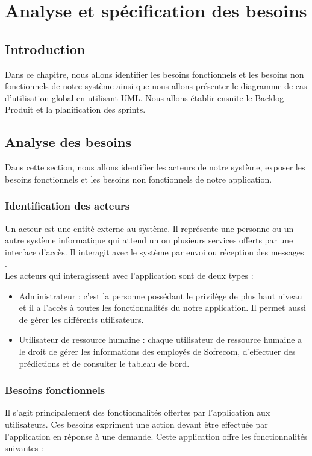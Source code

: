 \chapter{Analyse et spécification des besoins}

\section*{Introduction}
Dans ce chapitre, nous allons identifier les besoins fonctionnels et les besoins non fonctionnels de notre système ainsi que nous allons  présenter le diagramme de cas d’utilisation global en utilisant UML. Nous allons établir ensuite le Backlog Produit et la planification des sprints.

\section{Analyse des besoins}

Dans cette section, nous allons identifier les acteurs de notre système, exposer les besoins fonctionnels et les besoins non fonctionnels de notre application.
\subsection{ Identification des acteurs}
Un acteur est une entité externe au système. Il représente une personne ou un autre système informatique qui attend un ou plusieurs services offerts par une interface d’accès. Il interagit avec le système par envoi ou réception des messages \cite{identificationActeur}.\\
Les acteurs qui interagissent avec l’application sont de deux types :
       \begin{itemize}
    \item Administrateur : c'est la personne possédant le privilège de plus haut niveau et il a l'accès à toutes les fonctionnalités du notre application. Il permet aussi de gérer les différents utilisateurs.
    \item Utilisateur de ressource humaine : chaque utilisateur de ressource humaine a le droit de gérer les informations des employés de Sofrecom, d'effectuer des prédictions et de consulter le tableau de bord.
 \end{itemize}
    \subsection{Besoins fonctionnels}
      Il s’agit principalement des fonctionnalités offertes par l’application aux utilisateurs. Ces besoins expriment une action devant être effectuée par l’application en réponse à une demande. Cette application offre les fonctionnalités suivantes :
   
